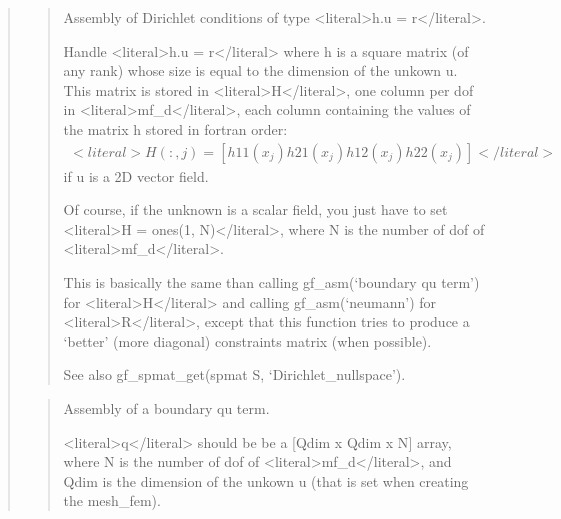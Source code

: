 \documentclass[a4paper,11pt,english]{sphinxmanual}
\begin{document}
\begin{quote}
\begin{quote}
\sphinxAtStartPar
Assembly of Dirichlet conditions of type \textless{}literal\textgreater{}h.u = r\textless{}/literal\textgreater{}.

\sphinxAtStartPar
Handle \textless{}literal\textgreater{}h.u = r\textless{}/literal\textgreater{} where h is a square matrix (of any rank) whose
size is equal to the dimension of the unkown u. This matrix is
stored in \textless{}literal\textgreater{}H\textless{}/literal\textgreater{}, one column per dof in \textless{}literal\textgreater{}mf\_d\textless{}/literal\textgreater{}, each column containing
the values of the matrix h stored in fortran order:
\begin{equation*}
\begin{split}<literal>H(:,j) = [h11(x_j) h21(x_j) h12(x_j) h22(x_j)]</literal>\end{split}
\end{equation*}
\sphinxAtStartPar
if u is a 2D vector field.

\sphinxAtStartPar
Of course, if the unknown is a scalar field, you just have to set
\textless{}literal\textgreater{}H = ones(1, N)\textless{}/literal\textgreater{}, where N is the number of dof of \textless{}literal\textgreater{}mf\_d\textless{}/literal\textgreater{}.

\sphinxAtStartPar
This is basically the same than calling gf\_asm(‘boundary qu term’)
for \textless{}literal\textgreater{}H\textless{}/literal\textgreater{} and calling gf\_asm(‘neumann’) for \textless{}literal\textgreater{}R\textless{}/literal\textgreater{}, except that this
function tries to produce a ‘better’ (more diagonal) constraints
matrix (when possible).

\sphinxAtStartPar
See also gf\_spmat\_get(spmat S, ‘Dirichlet\_nullspace’).
\end{quote}

\sphinxAtStartPar
{}
\begin{quote}

\sphinxAtStartPar
Assembly of a boundary qu term.

\sphinxAtStartPar
\textless{}literal\textgreater{}q\textless{}/literal\textgreater{} should be be a {[}Qdim x Qdim x N{]} array, where N is the number
of dof of \textless{}literal\textgreater{}mf\_d\textless{}/literal\textgreater{}, and Qdim is the dimension of the unkown u (that
is set when creating the mesh\_fem).


\end{quote}
\end{quote}
\end{document}
